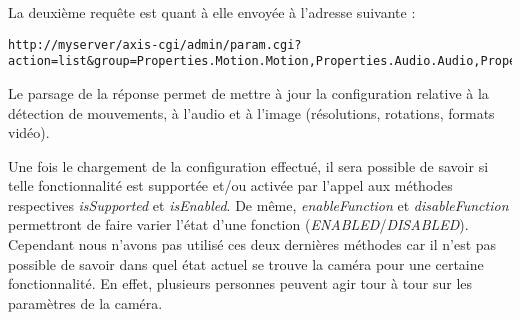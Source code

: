 La deuxième requête est quant à elle envoyée à l'adresse suivante :
\begin{lstlisting}
http://myserver/axis-cgi/admin/param.cgi?action=list&group=Properties.Motion.Motion,Properties.Audio.Audio,Properties.Image
\end{lstlisting}
Le parsage de la réponse permet de mettre à jour la configuration relative à la détection de mouvements, à l'audio et à l'image (résolutions, rotations, formats vidéo).

Une fois le chargement de la configuration effectué, il sera possible de savoir si telle fonctionnalité est supportée et/ou activée par l'appel aux méthodes respectives \textit{isSupported} et \textit{isEnabled}.
De même, \textit{enableFunction} et \textit{disableFunction} permettront de faire varier l'état d'une fonction (\textit{ENABLED}/\textit{DISABLED}). Cependant nous n'avons pas utilisé ces deux dernières méthodes car il n'est pas possible de savoir dans quel état actuel se trouve la caméra pour une certaine fonctionnalité.
En effet, plusieurs personnes peuvent agir tour à tour sur les paramètres de la caméra.

